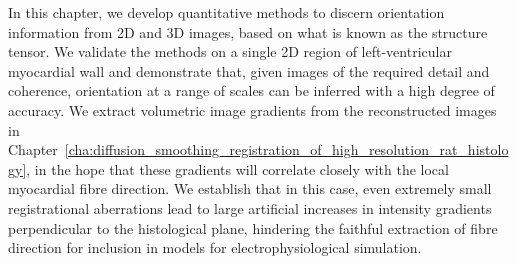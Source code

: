 
In this chapter, we develop quantitative methods to discern orientation information from 2D and 3D images, based on what is known as the structure tensor. We validate the methods on a single 2D region of left-ventricular myocardial wall and demonstrate that, given images of the required detail and coherence, orientation at a range of scales can be inferred with a high degree of accuracy. We extract volumetric image gradients from the reconstructed images in Chapter~\ref{cha:diffusion_smoothing_registration_of_high_resolution_rat_histology}, in the hope that these gradients will correlate closely with the local myocardial fibre direction. We establish that in this case, even extremely small registrational aberrations lead to large artificial increases in intensity gradients perpendicular to the histological plane, hindering the faithful extraction of fibre direction for inclusion in models for electrophysiological simulation.
